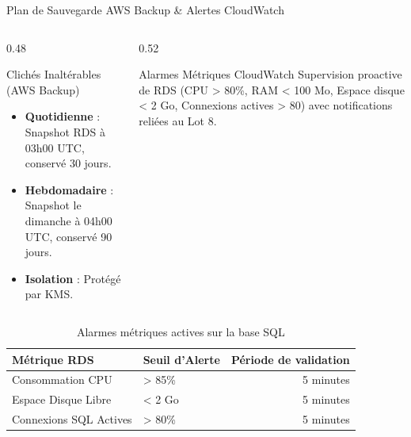 \documentclass{beamer}
\begin{document}
\begin{frame}{Plan de Sauvegarde AWS Backup \& Alertes CloudWatch}
    \begin{columns}
        \begin{column}{0.48\textwidth}
            \begin{block}{\small Clichés Inaltérables (AWS Backup)}
                \scriptsize
                \begin{itemize}
                    \item \textbf{Quotidienne} : Snapshot RDS à 03h00 UTC, conservé 30 jours.
                    \item \textbf{Hebdomadaire} : Snapshot le dimanche à 04h00 UTC, conservé 90 jours.
                    \item \textbf{Isolation} : Protégé par KMS.
                \end{itemize}
            \end{block}
        \end{column}
        \begin{column}{0.52\textwidth}
            \begin{block}{\small Alarmes Métriques CloudWatch}
                \scriptsize
                Supervision proactive de RDS (CPU > 80\%, RAM < 100 Mo, Espace disque < 2 Go, Connexions actives > 80) avec notifications reliées au Lot 8.
            \end{block}
        \end{column}
    \end{columns}
    \begin{table}
        \centering
        \caption{\tiny Alarmes métriques actives sur la base SQL}
        \begin{tabular}{llr}
            \toprule
            \textbf{Métrique RDS} & \textbf{Seuil d'Alerte} & \textbf{Période de validation} \\
            \midrule
            Consommation CPU & > 85\% & 5 minutes \\
            Espace Disque Libre & < 2 Go & 5 minutes \\
            Connexions SQL Actives & > 80\% & 5 minutes \\
            \bottomrule
        \end{tabular}
    \end{table}
\end{frame}
\end{document}
